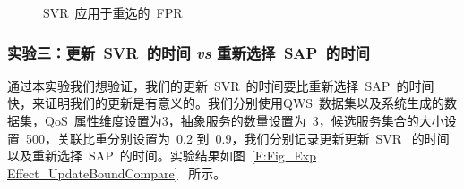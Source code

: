 \begin{figure}[!thb]
 \begin{minipage}[b]{1\linewidth} %
    \centering
    \hspace{0.05in}
    \caption{SVR~应用于重选的~FPR}
    \label{F:Fig_Exp Effect_Rate_FP}
  \end{minipage}%
\end{figure}



\subsubsection{实验三：更新~SVR~的时间 \textbf{\emph{vs}} 重新选择~SAP~的时间}

通过本实验我们想验证，我们的更新~SVR~的时间要比重新选择~SAP~的时间快，来证明我们的更新是有意义的。我们分别使用QWS~数据集以及系统生成的数据集，QoS~属性维度设置为3，抽象服务的数量设置为~3，候选服务集合的大小设置~500，关联比重分别设置为~0.2 到~0.9，我们分别记录更新更新~SVR~ 的时间以及重新选择~SAP~的时间。实验结果如图~\ref{F:Fig_Exp Effect_UpdateBoundCompare}~ 所示。


